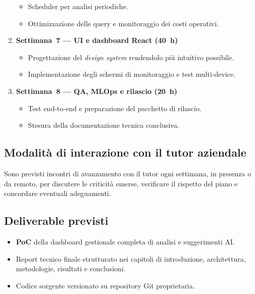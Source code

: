 \begin{enumerate}
        \begin{itemize}
            \item Scheduler per analisi periodiche.
            \item Ottimizzazione delle query e monitoraggio dei costi operativi.
        \end{itemize}
    \item \textbf{Settimana~7 — UI e dashboard React (40~h)}
        \begin{itemize}
            \item Progettazione del \textit{design system} rendendolo più intuitivo possibile.
            \item Implementazione degli schermi di monitoraggio e test multi‑device.
        \end{itemize}
    \item \textbf{Settimana~8 — QA, MLOps e rilascio (20~h)}
        \begin{itemize}
            \item Test end‑to‑end e preparazione del pacchetto di rilascio.
            \item Stesura della documentazione tecnica conclusiva.
        \end{itemize}
\end{enumerate}

\subsection{Modalità di interazione con il tutor aziendale}

Sono previsti incontri di avanzamento con il tutor ogni settimana, in presenza o da remoto, per discutere le criticità emerse, verificare il rispetto del piano e concordare eventuali adeguamenti.

\subsection{Deliverable previsti}

\begin{itemize}
    \item \textbf{PoC} della dashboard gestionale completa di analisi e suggerimenti AI.
    \item Report tecnico finale strutturato nei capitoli di introduzione, architettura, metodologie, risultati e conclusioni.
    \item Codice sorgente versionato su repository Git proprietaria.
\end{itemize}

\newpage



